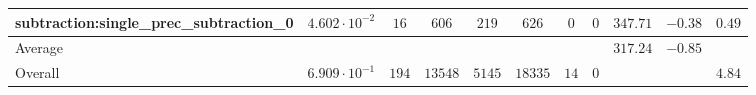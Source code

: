 \begin{tabular}{|l|c|c|c|c|c|c|c|c|c|c|}
subtraction:single\_prec\_subtraction\_0         & $ 4.602 \cdot 10^{-2} $ & $ 16     $ & $ 606   $ & $ 219  $ & $ 626   $ & $ 0  $ & $ 0 $ & $ 347.71      $ & $ -0.38   $ & $ 0.49    $ \\
\hline
Average                                          & $                     $ & $        $ & $       $ & $      $ & $       $ & $    $ & $   $ & $ 317.24      $ & $ -0.85   $ & $         $ \\
\hline
Overall                                          & $ 6.909 \cdot 10^{-1} $ & $ 194    $ & $ 13548 $ & $ 5145 $ & $ 18335 $ & $ 14 $ & $ 0 $ & $             $ & $         $ & $ 4.84    $ \\
\hline
\end{tabular}
